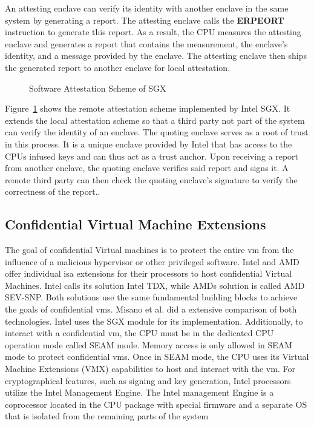 An attesting enclave can verify its identity with another enclave in the same
system by generating a report. The attesting enclave calls the \textbf{ERPEORT}
instruction to generate this report. As a result, the CPU measures the attesting
enclave and generates a report that contains the measurement, the enclave's
identity, and a message provided by the enclave. The attesting enclave then
ships the generated report to another enclave for local attestation.
\begin{center}
    \begin{figure}
        \centering
        
        \caption{Software Attestation Scheme of SGX}
        \label{fig:state:tee:sgx_attestation}
    \end{figure}
\end{center}
Figure~\ref{fig:state:tee:sgx_attestation} shows the remote attestation scheme
implemented by Intel SGX. It extends the local attestation scheme so that a
third party not part of the system can verify the identity of an enclave. The
quoting enclave serves as a root of trust in this process. It is a unique
enclave provided by Intel that has access to the CPUs infused keys and can thus
act as a trust anchor. Upon receiving a report from another enclave, the quoting
enclave verifies said report and signs it. A remote third party can then check
the quoting enclave's signature to verify the correctness of the report..

\subsection{Confidential Virtual Machine Extensions}
\label{section:20:confidential_vms}
The goal of confidential Virtual machines is to protect the entire \gls{vm} from
the influence of a malicious hypervisor or other privileged software. Intel and
AMD offer individual \gls{isa} extensions for their processors to host
confidential Virtual Machines. Intel calls its solution Intel TDX, while AMDs
solution is called AMD SEV-SNP.\cite{tdx_whitepaper,kaplan_amd_2020} Both
solutions use the same fundamental building blocks to achieve the goals of
confidential \gls{vm}s. Misano et al. did a extensive comparison of both
technologies.\cite{misono_confidential_2024} Intel uses the SGX module for its
implementation. Additionally, to interact with a confidential \gls{vm}, the CPU
must be in the dedicated CPU operation mode called SEAM mode. Memory access is
only allowed in SEAM mode to protect confidential \gls{vm}s. Once in SEAM mode,
the CPU uses its Virtual Machine Extensions (VMX) capabilities to host and
interact with the \gls{vm}. For cryptographical features, such as signing and
key generation, Intel processors utilize the Intel Management Engine. The Intel
management Engine is a coprocessor located in the CPU package with special
firmware and a separate OS that is isolated from the remaining parts of the
system\\

